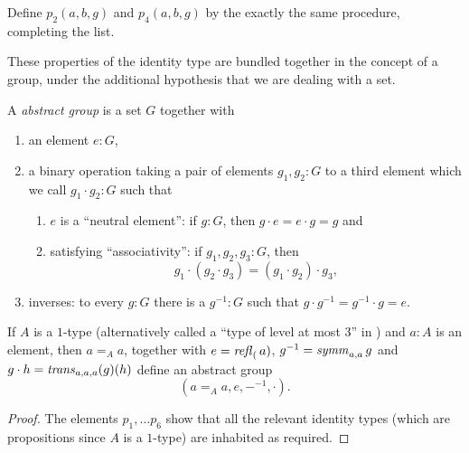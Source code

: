\begin{xca}
    Define $p_2(a,b,g)$ and $p_4(a,b,g)$ by the exactly the same procedure, completing the list.
\end{xca}


These properties of the identity type are bundled together in the concept of a group, under the additional hypothesis that we are dealing with a set.

  \begin{definition}\label{def:abstractgroup}
    A {\em abstract group} is a set $G$ together with
\begin{enumerate}
\item an element $e:G$, 
\item a binary operation taking a pair of elements $g_1,g_2:G$ to a third element which we call $g_1\cdot g_2:G$ such that
  \begin{enumerate}
  \item $e$ is a ``neutral element'': if $g:G$, then $g\cdot e=e\cdot g=g$ and
  \item satisfying ``associativity'': if $g_1,g_2,g_3:G$, then 
$$g_1\cdot(g_2\cdot g_3)=(g_1\cdot g_2)\cdot g_3,$$
  \end{enumerate}
\item inverses: to every $g:G$ there is a $g^{-1}:G$ such that $g\cdot g^{-1}=g^{-1}\cdot g=e$.
\end{enumerate} 
  \end{definition}

  \begin{lemma}\label{lem:idtypesgiveabstractgroups}
    If $A$ is a $1$-type (alternatively called a ``type of level at most $3$'' in ) and $a:A$ is an element, then $a=_Aa$, together with $e=\mathop{{\it refl}_{(}}a)$, $g^{-1}=\mathop{\mathit{symm}}_{a,a}g$ and $g\cdot h=\mathop{\mathit{trans}}_{a,a,a}(g)(h)$ define an abstract group 
$$(a=_Aa,e,{-}^{-1},\cdot).$$
  \end{lemma}
  \begin{proof}
    The elements $p_1,\dots p_6$ show that all the relevant identity types (which are propositions since $A$ is a $1$-type) are inhabited as required.
  \end{proof}


\newcommand{\typegroup}{\mathbf{Groups}}
\newcommand{\typeset}{\mathbf{Sets}}
\newcommand{\iscontr}{\mathrm{isContr}}
\newcommand{\isset}{\mathrm{isSet}}
\newcommand{\isonetype}{\mathrm{1Type}}
\newcommand{\isconn}{\mathrm{isConn}}
\newcommand{\conn}{\mathrm{conn}}
\newcommand{\aut}{\mathrm{Aut}}
\newcommand{\Hom}{\mathrm{Hom}}

